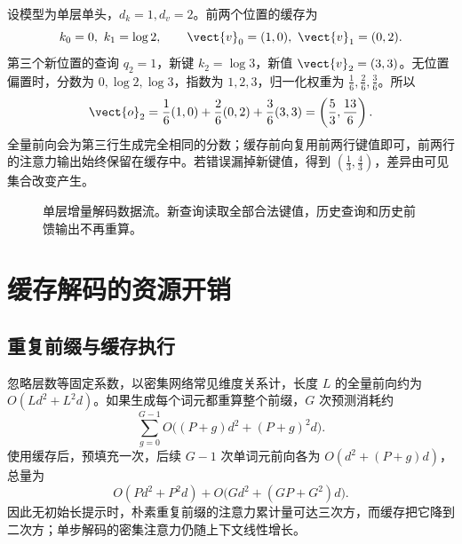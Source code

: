 \documentclass[../textbook.tex]{subfiles}
\begin{document}
\begin{example}


设模型为单层单头，$d_k=1,d_v=2$。前两个位置的缓存为
\begin{equation*}
 k_0=0,\ k_1=\log2,\qquad \vect{v}_0=(1,0),\ \vect{v}_1=(0,2).
\end{equation*}
第三个新位置的查询 $q_2=1$，新键 $k_2=\log3$，新值 $\vect{v}_2=(3,3)$。无位置偏置时，分数为 $0,\log2,\log3$，指数为 $1,2,3$，归一化权重为 $\frac{1}{6},\frac{2}{6},\frac{3}{6}$。所以
\begin{equation*}
 \vect{o}_2=\frac16(1,0)+\frac26(0,2)+\frac36(3,3)
 =\left(\frac53,\frac{13}{6}\right).
\end{equation*}
全量前向会为第三行生成完全相同的分数；缓存前向复用前两行键值即可，前两行的注意力输出始终保留在缓存中。若错误漏掉新键值，得到 $(\frac{1}{3},\frac{4}{3})$，差异由可见集合改变产生。

\begin{figure}[htbp]
\centering
{}
\caption[单层增量解码数据流]{单层增量解码数据流。新查询读取全部合法键值，历史查询和历史前馈输出不再重算。}\label{fig:cache-incremental}
\end{figure}
\end{example}

\section{缓存解码的资源开销}

\subsection{重复前缀与缓存执行}
忽略层数等固定系数，以密集网络常见维度关系计，长度 $L$ 的全量前向约为 $O(Ld^2+L^2d)$。如果生成每个词元都重算整个前缀，$G$ 次预测消耗约
\begin{equation}
 \sum_{g=0}^{G-1}O\big((P+g)d^2+(P+g)^2d\big).
 \label{eq:cache-naive}
\end{equation}
使用缓存后，预填充一次，后续 $G-1$ 次单词元前向各为 $O(d^2+(P+g)d)$，总量为
\begin{equation}
 O(Pd^2+P^2d)+O\big(Gd^2+(GP+G^2)d\big).
 \label{eq:cache-complexity}
\end{equation}
因此无初始长提示时，朴素重复前缀的注意力累计量可达三次方，而缓存把它降到二次方；单步解码的密集注意力仍随上下文线性增长。
\end{document}
